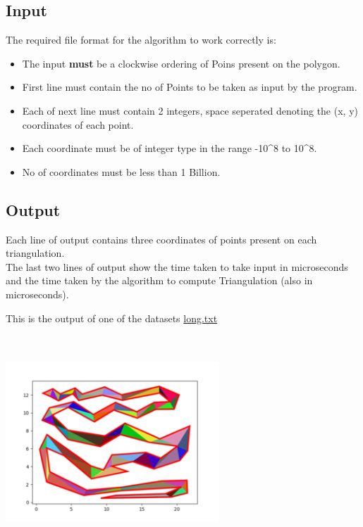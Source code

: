 \hypertarget{input}{%
\subsection{Input}\label{input}}

The required file format for the algorithm to work correctly is:

\begin{itemize}
\tightlist
\item
  The input \textbf{must} be a clockwise ordering of Poins present on
  the polygon.
\item
  First line must contain the no of Points to be taken as input by the
  program.
\item
  Each of next line must contain 2 integers, space seperated denoting
  the (x, y) coordinates of each point.
\item
  Each coordinate must be of integer type in the range -10\^{}8 to
  10\^{}8.
\item
  No of coordinates must be less than 1 Billion.
\end{itemize}

\hypertarget{output}{%
\subsection{Output}\label{output}}

Each line of output contains three coordinates of points present on each
triangulation.\\
The last two lines of output show the time taken to take input in
microseconds and the time taken by the algorithm to compute
Triangulation (also in microseconds).

This is the output of one of the datasets
\href{./datasets/long.txt}{long.txt}

\includegraphics[width=8cm,height=8cm]{img/TRIsnake.png}\\

